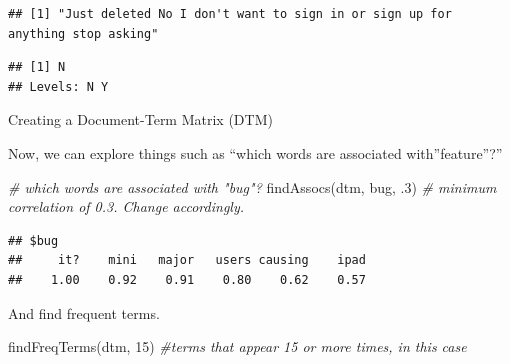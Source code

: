 \documentclass[
]{book}
\newenvironment{Shaded}{\begin{snugshade}}{\end{snugshade}}
\newcommand{\CommentTok}[1]{\textcolor[rgb]{0.56,0.35,0.01}{\textit{#1}}}
\newcommand{\DecValTok}[1]{\textcolor[rgb]{0.00,0.00,0.81}{#1}}
\newcommand{\FunctionTok}[1]{\textcolor[rgb]{0.00,0.00,0.00}{#1}}
\newcommand{\NormalTok}[1]{#1}
\newcommand{\SpecialCharTok}[1]{\textcolor[rgb]{0.00,0.00,0.00}{#1}}
\newcommand{\StringTok}[1]{\textcolor[rgb]{0.31,0.60,0.02}{#1}}
\begin{document}
\begin{Shaded}
\end{Shaded}

\begin{verbatim}
## [1] "Just deleted No I don't want to sign in or sign up for anything stop asking"
\end{verbatim}

\begin{Shaded}
\end{Shaded}

\begin{verbatim}
## [1] N
## Levels: N Y
\end{verbatim}

Creating a Document-Term Matrix (DTM)

Now, we can explore things such as ``which words are associated with''feature''?''

\begin{Shaded}
\begin{Highlighting}[]
\CommentTok{\# which words are associated with "bug"?}
\FunctionTok{findAssocs}\NormalTok{(dtm, }\StringTok{\textquotesingle{}bug\textquotesingle{}}\NormalTok{, .}\DecValTok{3}\NormalTok{) }\CommentTok{\# minimum correlation of 0.3. Change accordingly. }
\end{Highlighting}
\end{Shaded}

\begin{verbatim}
## $bug
##     it?    mini   major   users causing    ipad 
##    1.00    0.92    0.91    0.80    0.62    0.57
\end{verbatim}

And find frequent terms.

\begin{Shaded}
\begin{Highlighting}[]
\FunctionTok{findFreqTerms}\NormalTok{(dtm, }\DecValTok{15}\NormalTok{) }\CommentTok{\#terms that appear 15 or more times, in this case}
\end{Highlighting}
\end{Shaded}
\end{document}
